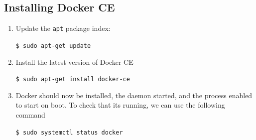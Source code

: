 \subsection{Installing Docker CE}
\begin{enumerate}
	\item  Update the \verb=apt= package index: \newline \begin{center}{\verb=$ sudo apt-get update=}\end{center}
	\item Install the latest version of Docker CE \newline \begin{center}{\verb=$ sudo apt-get install docker-ce=}\end{center}
	\item Docker should now be installed, the daemon started, and the process enabled to start on boot. To check that its running, we can use the following command\newline\begin{center}{\verb=$ sudo systemctl status docker=}\end{center}
\end{enumerate}

